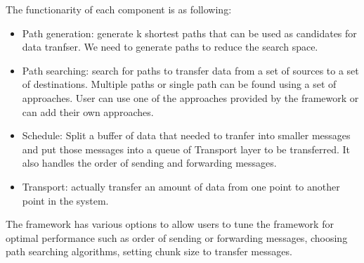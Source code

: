The functionarity of each component is as following:
\begin{itemize}
\item Path generation: generate k shortest paths that can be used as candidates for data tranfser. We need to generate paths to reduce the search space.
\item Path searching: search for paths to transfer data from a set of sources to a set of destinations. Multiple paths or single path can be found using a set of approaches. User can use one of the approaches provided by the framework or can add their own approaches.

\item Schedule: Split a buffer of data that needed to tranfer into smaller messages and put those messages into a queue of Transport layer to be transferred. It also handles the order of sending and forwarding messages.

\item Transport: actually transfer an amount of data from one point to another point in the system.

\end{itemize}

The framework has various options to allow users to tune the framework for optimal performance such as order of sending or forwarding messages, choosing path searching algorithms, setting chunk size to transfer messages. 
